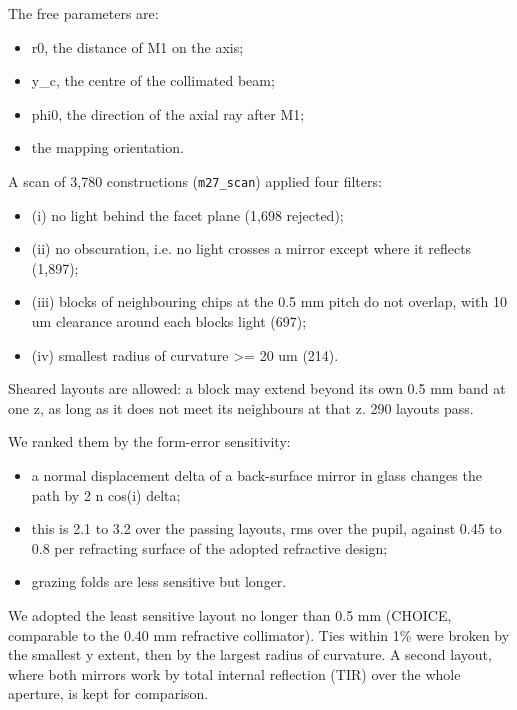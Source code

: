 The free parameters are:

\begin{itemize}
\tightlist
\item
  r0, the distance of M1 on the axis;
\item
  y\_c, the centre of the collimated beam;
\item
  phi0, the direction of the axial ray after M1;
\item
  the mapping orientation.
\end{itemize}

A scan of 3,780 constructions (\texttt{m27\_scan}) applied four filters:

\begin{itemize}
\tightlist
\item
  (i) no light behind the facet plane (1,698 rejected);
\item
  (ii) no obscuration, i.e. no light crosses a mirror except where it
  reflects (1,897);
\item
  (iii) blocks of neighbouring chips at the 0.5 mm pitch do not overlap,
  with 10 um clearance around each block\textquotesingle s light (697);
\item
  (iv) smallest radius of curvature \textgreater= 20 um (214).
\end{itemize}

Sheared layouts are allowed: a block may extend beyond its own 0.5 mm
band at one z, as long as it does not meet its neighbours at that z. 290
layouts pass.

We ranked them by the form-error sensitivity:

\begin{itemize}
\tightlist
\item
  a normal displacement delta of a back-surface mirror in glass changes
  the path by 2 n cos(i) delta;
\item
  this is 2.1 to 3.2 over the passing layouts, rms over the pupil,
  against 0.45 to 0.8 per refracting surface of the adopted refractive
  design;
\item
  grazing folds are less sensitive but longer.
\end{itemize}

We adopted the least sensitive layout no longer than 0.5 mm (CHOICE,
comparable to the 0.40 mm refractive collimator). Ties within 1\% were
broken by the smallest y extent, then by the largest radius of
curvature. A second layout, where both mirrors work by total internal
reflection (TIR) over the whole aperture, is kept for comparison.

